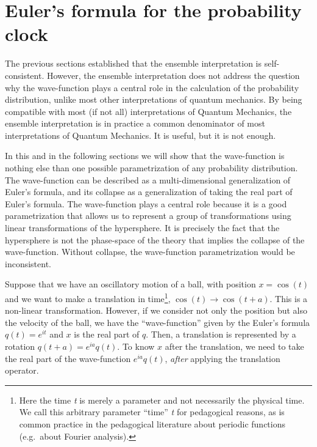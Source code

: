 \documentclass[11pt]{book}
\begin{document}
\hypertarget{eulers-formula-for-the-probability-clock}{%
\section{Euler's formula for the probability
clock}\label{eulers-formula-for-the-probability-clock}}

The previous sections established that the ensemble interpretation is
self-consistent. However, the ensemble interpretation does not address
the question why the wave-function plays a central role in the
calculation of the probability distribution, unlike most other
interpretations of quantum mechanics. By being compatible with most (if
not all) interpretations of Quantum Mechanics, the ensemble
interpretation is in practice a common denominator of most
interpretations of Quantum Mechanics. It is useful, but it is not
enough.

In this and in the following sections we will show that the
wave-function is nothing else than one possible parametrization of any
probability distribution. The wave-function can be described as a
multi-dimensional generalization of Euler's formula, and its collapse as
a generalization of taking the real part of Euler's formula. The
wave-function plays a central role because it is a good parametrization
that allows us to represent a group of transformations using linear
transformations of the hypersphere. It is precisely the fact that the
hypersphere is not the phase-space of the theory that implies the
collapse of the wave-function. Without collapse, the wave-function
parametrization would be inconsistent.

Suppose that we have an oscillatory motion of a ball, with position
\(x=\cos(t)\) and we want to make a translation in time\footnote{Here
  the time {\emph{t}} is merely a parameter and not necessarily the
  physical time. We call this arbitrary parameter ``time'' {\emph{t}}
  for pedagogical reasons, as is common practice in the pedagogical
  literature about periodic functions (e.g.~about Fourier analysis).},
\(\cos(t)\to \cos(t+a)\). This is a non-linear transformation. However,
if we consider not only the position but also the velocity of the ball,
we have the ``wave-function'' given by the Euler's formula
\(q(t)=e^{it}\) and \(x\) is the real part of \(q\). Then, a translation
is represented by a rotation \(q(t+a)=e^{ia} q(t)\). To know \(x\) after
the translation, we need to take the real part of the wave-function
\(e^{ia} q(t)\), \emph{after} applying the translation operator.
\end{document}
